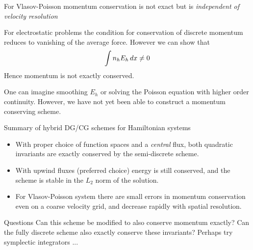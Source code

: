 \documentclass[pdf]{beamer}
\newcommand{\mypause}{\pause}
\theoremstyle{definition}
\begin{document}
\begin{frame}{For Vlasov-Poisson momentum conservation is not exact
    but is \emph{independent of velocity resolution}}%

  For electrostatic problems the condition for conservation of
  discrete momentum reduces to vanishing of the average force. However
  we can show that
  \begin{align*}
    \int n_h E_h\thinspace dx \ne 0
  \end{align*}
  Hence momentum is not exactly conserved.

  \mypause One can imagine smoothing $E_h$ or solving the Poisson
  equation with higher order continuity. However, we have not yet been
  able to construct a momentum conserving scheme.
\end{frame}

\begin{frame}{Summary of hybrid DG/CG schemes for Hamiltonian systems}

  \begin{itemize}
  \item With proper choice of function spaces and a \emph{central}
    flux, both quadratic invariants are exactly conserved by the
    semi-discrete scheme.
  \item With upwind fluxes (preferred choice) energy is still
    conserved, and the scheme is stable in the $L_2$ norm of the
    solution.
  \item For Vlasov-Poisson system there are small errors in momentum
    conservation even on a coarse velocity grid, and decrease rapidly
    with spatial resolution.
  \end{itemize}
  \mypause
  \begin{block}{Questions}
    Can this scheme be modified to also conserve momentum exactly? Can
    the fully discrete scheme also exactly conserve these invariants?
    Perhaps try symplectic integrators ...
  \end{block}

\end{frame}
\end{document}
